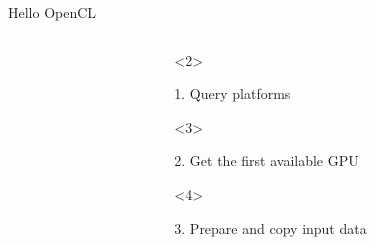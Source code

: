 \documentclass[@BEAMER_OPTIONS@]{beamer}
\begin{document}
\begin{frame}[fragile]{Hello OpenCL}
\begin{columns}
\begin{column}[c]{0.25\textwidth}
\begin{exampleblock}{}
\begin{adjustbox}{width=0.25\textwidth, height=\textheight, keepaspectratio}
\begin{minipage}{\textwidth}
\begin{uncoverenv}
                            
                        \end{uncoverenv}
                    \end{minipage}
                \end{adjustbox}
            \end{exampleblock}
        \end{column}
        \begin{column}[c]{0.7\textwidth}
            \begin{onlyenv}<2>
                \begin{exampleblock}{1. Query platforms}
                    \begin{adjustbox}{width=0.75\textwidth, height=\textheight, keepaspectratio}
                        \begin{minipage}{\textwidth}
                            
                        \end{minipage}
                    \end{adjustbox}
                \end{exampleblock}
            \end{onlyenv}
            \begin{onlyenv}<3>
                \begin{exampleblock}{2. Get the first available GPU}
                    \begin{adjustbox}{width=0.75\textwidth, height=\textheight, keepaspectratio}
                        \begin{minipage}{\textwidth}
                            
                        \end{minipage}
                    \end{adjustbox}
                \end{exampleblock}
            \end{onlyenv}
            \begin{onlyenv}<4>
                \begin{exampleblock}{3. Prepare and copy input data}
                    \begin{adjustbox}{width=0.75\textwidth, height=\textheight, keepaspectratio}
                        \begin{minipage}{\textwidth}
                            

\end{minipage}
\end{adjustbox}
\end{exampleblock}
\end{onlyenv}
\end{column}
\end{columns}
\end{frame}
\end{document}
